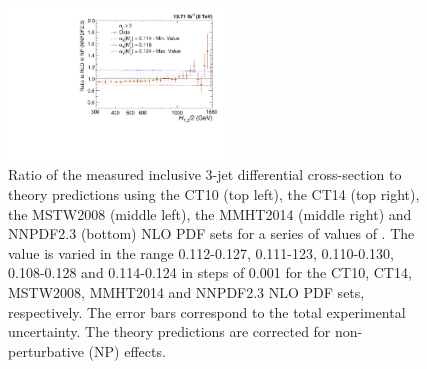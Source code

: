 \begin{figure}[!htbp]
\begin{center}
 \vspace*{3mm}
 \includegraphics[width=0.51\textwidth]{Plots_HT_2_150/Sensitivity_3_ratio_NLO_NNPDF23.pdf}
 \caption[Ratio of the measured inclusive 3-jet differential cross-section to theory predictions using different PDF sets.]{Ratio of the measured inclusive 3-jet differential cross-section to theory predictions using the CT10 (top left), the CT14 (top right), the MSTW2008 (middle left), the MMHT2014 (middle right) and NNPDF2.3 (bottom) NLO PDF sets for a series of values of \alpsmz. The \alpsmz value is varied in the range 0.112-0.127, 0.111-123, 0.110-0.130, 0.108-0.128 and 0.114-0.124 in steps of 0.001 for the CT10, CT14, MSTW2008, MMHT2014 and NNPDF2.3 NLO PDF sets, respectively. The error bars correspond to the total experimental uncertainty. The theory predictions are corrected for non-perturbative (NP) effects.}
 \label{fig:sensitivity_3}
 \end{center}
\end{figure}

